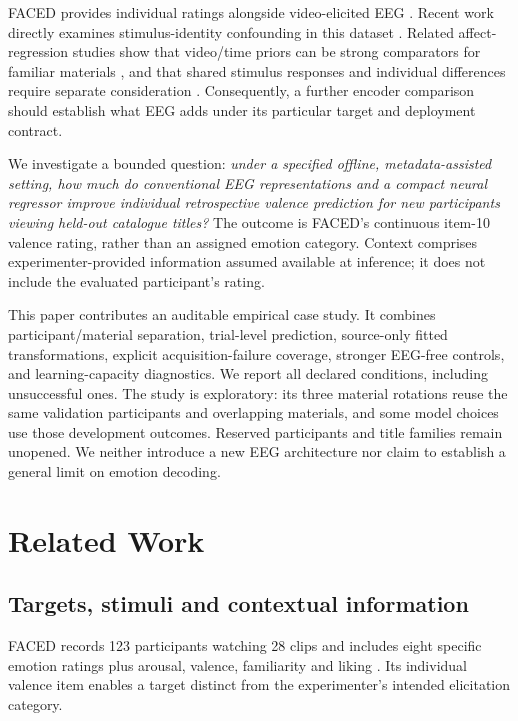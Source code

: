 \documentclass[conference]{IEEEtran}
\begin{document}
FACED provides individual ratings alongside video-elicited EEG \cite{chen2023faced}. Recent work directly examines stimulus-identity confounding in this dataset \cite{gerster2026stimulus}. Related affect-regression studies show that video/time priors can be strong comparators for familiar materials \cite{kong2026priors}, and that shared stimulus responses and individual differences require separate consideration \cite{wang2026shared}. Consequently, a further encoder comparison should establish what EEG adds under its particular target and deployment contract.

We investigate a bounded question: \emph{under a specified offline, metadata-assisted setting, how much do conventional EEG representations and a compact neural regressor improve individual retrospective valence prediction for new participants viewing held-out catalogue titles?} The outcome is FACED's continuous item-10 valence rating, rather than an assigned emotion category. Context comprises experimenter-provided information assumed available at inference; it does not include the evaluated participant's rating.

This paper contributes an auditable empirical case study. It combines participant/material separation, trial-level prediction, source-only fitted transformations, explicit acquisition-failure coverage, stronger EEG-free controls, and learning-capacity diagnostics. We report all declared conditions, including unsuccessful ones. The study is exploratory: its three material rotations reuse the same validation participants and overlapping materials, and some model choices use those development outcomes. Reserved participants and title families remain unopened. We neither introduce a new EEG architecture nor claim to establish a general limit on emotion decoding.

\section{Related Work}
\subsection{Targets, stimuli and contextual information}
FACED records 123 participants watching 28 clips and includes eight specific emotion ratings plus arousal, valence, familiarity and liking \cite{chen2023faced}. Its individual valence item enables a target distinct from the experimenter's intended elicitation category.
\end{document}
